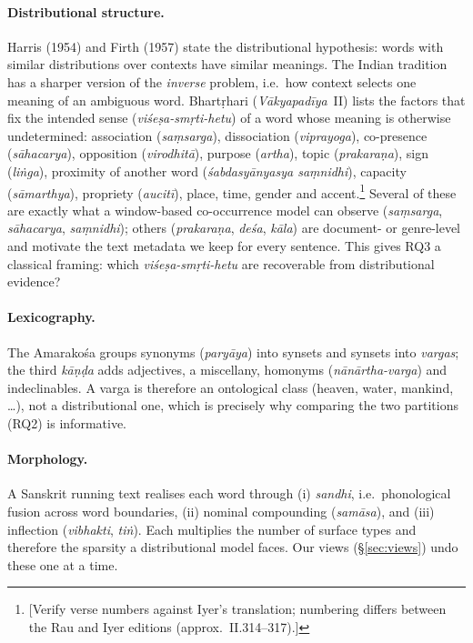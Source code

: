 \documentclass[11pt,a4paper]{article}
\theoremstyle{remark}\newtheorem{remark}{Remark}
\newcommand{\todo}[1]{\textcolor{red!70!black}{[#1]}}
\begin{document}
\paragraph{Distributional structure.} Harris (1954) and Firth (1957) state the
distributional hypothesis: words with similar distributions over contexts have
similar meanings. The Indian tradition has a sharper version of the
\emph{inverse} problem, i.e.\ how context selects one meaning of an
ambiguous word. Bhartṛhari (\emph{Vākyapadīya}~II) lists the factors that fix
the intended sense (\emph{viśeṣa-smṛti-hetu}) of a word whose meaning is
otherwise undetermined: association (\emph{saṃsarga}), dissociation
(\emph{viprayoga}), co-presence (\emph{sāhacarya}), opposition
(\emph{virodhitā}), purpose (\emph{artha}), topic (\emph{prakaraṇa}), sign
(\emph{liṅga}), proximity of another word (\emph{śabdasyānyasya
saṃnidhi}), capacity (\emph{sāmarthya}), propriety (\emph{aucitī}), place,
time, gender and accent.\footnote{\todo{Verify verse numbers against Iyer's
translation; numbering differs between the Rau and Iyer editions
(approx.\ II.314--317).}} Several of these are exactly what a window-based
co-occurrence model can observe (\emph{saṃsarga}, \emph{sāhacarya},
\emph{saṃnidhi}); others (\emph{prakaraṇa}, \emph{deśa}, \emph{kāla}) are
document- or genre-level and motivate the text metadata we keep for every
sentence. This gives RQ3 a classical framing: which \emph{viśeṣa-smṛti-hetu}
are recoverable from distributional evidence?

\paragraph{Lexicography.} The Amarakośa groups synonyms
(\emph{paryāya}) into synsets and synsets into \emph{vargas}; the third
\emph{kāṇḍa} adds adjectives, a miscellany, homonyms
(\emph{nānārtha-varga}) and indeclinables. A varga is therefore an ontological
class (heaven, water, mankind, \dots), not a distributional one, which is
precisely why comparing the two partitions (RQ2) is informative.

\paragraph{Morphology.} A Sanskrit running text realises each word through
(i) \emph{sandhi}, i.e.\ phonological fusion across word boundaries, (ii)
nominal compounding (\emph{samāsa}), and (iii) inflection (\emph{vibhakti},
\emph{tiṅ}). Each multiplies the number of surface types and therefore the
sparsity a distributional model faces. Our views (\S\ref{sec:views}) undo these
one at a time.
\end{document}
